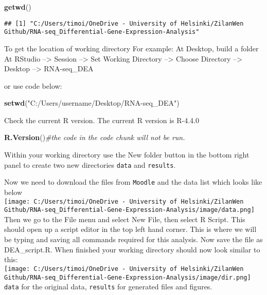 \documentclass[
]{article}
\newenvironment{Shaded}{\begin{snugshade}}{\end{snugshade}}
\newcommand{\CommentTok}[1]{\textcolor[rgb]{0.56,0.35,0.01}{\textit{#1}}}
\newcommand{\FunctionTok}[1]{\textcolor[rgb]{0.13,0.29,0.53}{\textbf{#1}}}
\newcommand{\NormalTok}[1]{#1}
\newcommand{\StringTok}[1]{\textcolor[rgb]{0.31,0.60,0.02}{#1}}
\begin{document}
\begin{Shaded}
\begin{Highlighting}[]
\FunctionTok{getwd}\NormalTok{()}
\end{Highlighting}
\end{Shaded}

\begin{verbatim}
## [1] "C:/Users/timoi/OneDrive - University of Helsinki/ZilanWen Github/RNA-seq_Differential-Gene-Expression-Analysis"
\end{verbatim}

To get the location of working directory For example: At Desktop, build
a folder At RStudio --\textgreater{} Session --\textgreater{} Set
Working Directory --\textgreater{} Choose Directory --\textgreater{}
Desktop --\textgreater{} RNA-seq\_DEA

or use code below:

\begin{Shaded}
\begin{Highlighting}[]
\FunctionTok{setwd}\NormalTok{(}\StringTok{"C:/Users/username/Desktop/RNA{-}seq\_DEA"}\NormalTok{)}
\end{Highlighting}
\end{Shaded}

Check the current R version. The current R version is R-4.4.0

\begin{Shaded}
\begin{Highlighting}[]
\FunctionTok{R.Version}\NormalTok{()}\CommentTok{\#the code in the code chunk will not be run.}
\end{Highlighting}
\end{Shaded}

Within your working directory use the New folder button in the bottom
right panel to create two new directories \texttt{data} and
\texttt{results}.

Now we need to download the files from \texttt{Moodle} and the data list
which looks like below\\
\texttt{[image: C:/Users/timoi/OneDrive - University of Helsinki/ZilanWen Github/RNA-seq\_Differential-Gene-Expression-Analysis/image/data.png]}
Then we go to the File menu and select New File, then select R Script.
This should open up a script editor in the top left hand corner. This is
where we will be typing and saving all commands required for this
analysis. Now save the file as DEA\_script.R. When finished your working
directory should now look similar to this:\\
\texttt{[image: C:/Users/timoi/OneDrive - University of Helsinki/ZilanWen Github/RNA-seq\_Differential-Gene-Expression-Analysis/image/dir.png]}
\texttt{data} for the original data, \texttt{results} for generated
files and figures.
\end{document}
